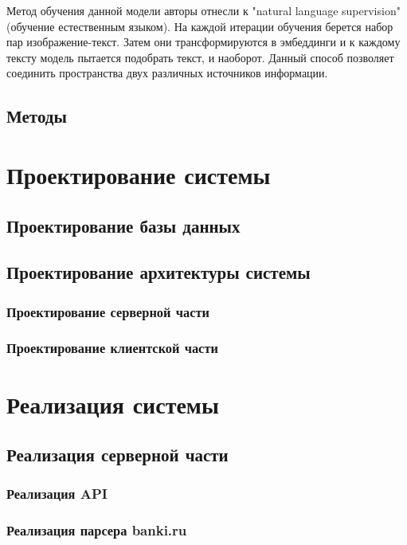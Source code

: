 \documentclass[PI, VKR]{HSEUniversity}
\begin{document}
Метод обучения данной модели авторы отнесли к "natural language supervision" (обучение естественным языком). На каждой итерации обучения берется набор пар изображение-текст. Затем они трансформируются в эмбеддинги и к каждому тексту модель пытается подобрать текст, и наоборот. Данный способ позволяет соединить пространства двух различных источников информации.
\section{Методы}
\label{sec:org83b59fb}
\chapter{Проектирование системы}
\label{sec:orgf1c2c17}
\section{Проектирование базы данных}
\label{sec:org995d78b}

\section{Проектирование архитектуры системы}
\label{sec:orga531dbb}
\subsection{Проектирование серверной части}
\label{sec:org1bfb8f7}
\subsection{Проектирование клиентской части}
\label{sec:org4bbd025}

\chapter{Реализация системы}
\label{sec:org293e775}
\section{Реализация серверной части}
\label{sec:org06bb31c}
\subsection{Реализация API}
\label{sec:org8e055dd}
\subsection{Реализация парсера banki.ru}
\label{sec:orgbab9b4f}
\end{document}
